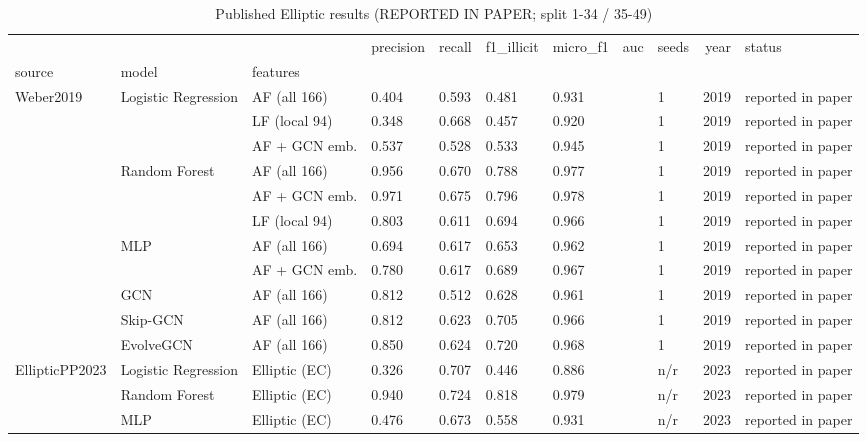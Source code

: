 \begin{table}
\caption{Published Elliptic results (REPORTED IN PAPER; split 1-34 / 35-49)}
\label{tab:03_reported_in_paper}
\begin{tabular}{lllllllllrl}
\toprule
 &  &  & precision & recall & f1\_illicit & micro\_f1 & auc & seeds & year & status \\
source & model & features &  &  &  &  &  &  &  &  \\
\midrule
\multirow[t]{11}{*}{Weber2019} & \multirow[t]{3}{*}{Logistic Regression} & AF (all 166) & 0.404 & 0.593 & 0.481 & 0.931 &  & 1 & 2019 & reported in paper \\
 &  & LF (local 94) & 0.348 & 0.668 & 0.457 & 0.920 &  & 1 & 2019 & reported in paper \\
 &  & AF + GCN emb. & 0.537 & 0.528 & 0.533 & 0.945 &  & 1 & 2019 & reported in paper \\
\cline{2-11}
 & \multirow[t]{3}{*}{Random Forest} & AF (all 166) & 0.956 & 0.670 & 0.788 & 0.977 &  & 1 & 2019 & reported in paper \\
 &  & AF + GCN emb. & 0.971 & 0.675 & 0.796 & 0.978 &  & 1 & 2019 & reported in paper \\
 &  & LF (local 94) & 0.803 & 0.611 & 0.694 & 0.966 &  & 1 & 2019 & reported in paper \\
\cline{2-11}
 & \multirow[t]{2}{*}{MLP} & AF (all 166) & 0.694 & 0.617 & 0.653 & 0.962 &  & 1 & 2019 & reported in paper \\
 &  & AF + GCN emb. & 0.780 & 0.617 & 0.689 & 0.967 &  & 1 & 2019 & reported in paper \\
\cline{2-11}
 & GCN & AF (all 166) & 0.812 & 0.512 & 0.628 & 0.961 &  & 1 & 2019 & reported in paper \\
\cline{2-11}
 & Skip-GCN & AF (all 166) & 0.812 & 0.623 & 0.705 & 0.966 &  & 1 & 2019 & reported in paper \\
\cline{2-11}
 & EvolveGCN & AF (all 166) & 0.850 & 0.624 & 0.720 & 0.968 &  & 1 & 2019 & reported in paper \\
\cline{1-11} \cline{2-11}
\multirow[t]{8}{*}{EllipticPP2023} & Logistic Regression & Elliptic (EC) & 0.326 & 0.707 & 0.446 & 0.886 &  & n/r & 2023 & reported in paper \\
\cline{2-11}
 & Random Forest & Elliptic (EC) & 0.940 & 0.724 & 0.818 & 0.979 &  & n/r & 2023 & reported in paper \\
\cline{2-11}
 & MLP & Elliptic (EC) & 0.476 & 0.673 & 0.558 & 0.931 &  & n/r & 2023 & reported in paper \\

\end{tabular}
\end{table}
